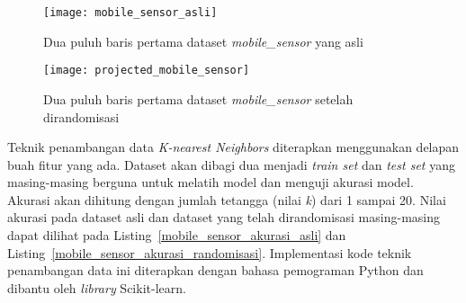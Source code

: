 \begin{figure}
	\centering
	\texttt{[image: mobile\_sensor\_asli]}
	\caption{Dua puluh baris pertama dataset \textit{mobile\_sensor} yang asli}
	\label{fig:mobile_sensor_asli}
\end{figure}

\begin{figure}
	\centering
	\texttt{[image: projected\_mobile\_sensor]}
	\caption{Dua puluh baris pertama dataset \textit{mobile\_sensor} setelah dirandomisasi}
	\label{fig:projected_mobile_sensor}
\end{figure}

Teknik penambangan data \textit{K-nearest Neighbors} diterapkan menggunakan delapan buah fitur yang ada. Dataset akan dibagi dua menjadi \textit{train set} dan \textit{test set} yang masing-masing berguna untuk melatih model dan menguji akurasi model. Akurasi akan dihitung dengan jumlah tetangga (nilai \textit{k}) dari 1 sampai 20. Nilai akurasi pada dataset asli dan dataset yang telah dirandomisasi masing-masing dapat dilihat pada Listing~\ref{mobile_sensor_akurasi_asli} dan Listing~\ref{mobile_sensor_akurasi_randomisasi}. Implementasi kode teknik penambangan data ini diterapkan dengan bahasa pemograman Python dan dibantu oleh \textit{library} Scikit-learn. 

